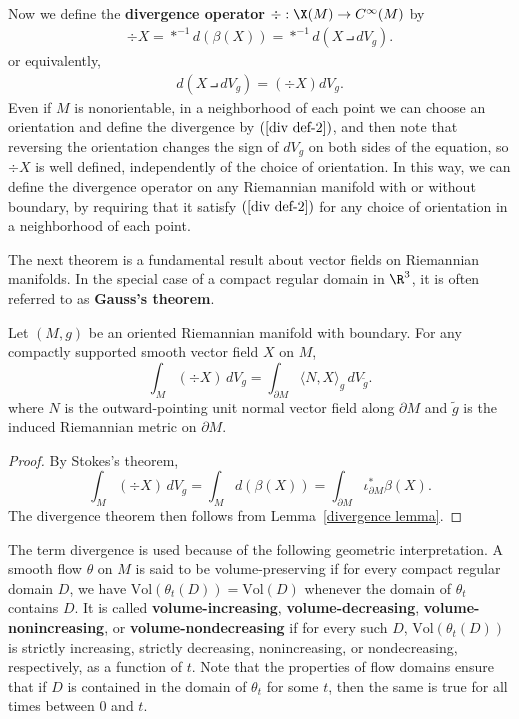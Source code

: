 Now we define the \textbf{divergence operator} $\div:\X(M)\to C^\infty(M)$ by
\begin{align}\label{div def-1}
\div X=\ast^{-1}d(\beta(X))=\ast^{-1}d(X\intprod dV_g).
\end{align}
or equivalently,
\begin{align}\label{div def-2}
d(X\intprod dV_g)=(\div X)dV_g.
\end{align}
Even if $M$ is nonorientable, in a neighborhood of each point we can choose an orientation and define the divergence by $(\ref{div def-2})$, and then note that reversing the orientation changes the sign of $dV_g$ on both sides of the equation, so $\div X$ is well defined, independently of the choice of orientation. In this way, we can define the divergence operator on any Riemannian manifold with or without boundary, by requiring that it satisfy $(\ref{div def-2})$ for any choice of orientation in a neighborhood of each point.\par
The next theorem is a fundamental result about vector fields on Riemannian manifolds. In the special case of a compact regular domain in $\R^3$, it is often referred to as \textbf{Gauss's theorem}.
\begin{theorem}
Let $(M,g)$ be an oriented Riemannian manifold with boundary. For any compactly supported smooth vector field $X$ on $M$,
\[\int_M(\div X)\,dV_g=\int_{\partial M}\langle N,X\rangle_g\,dV_{\widetilde{g}}.\]
where $N$ is the outward-pointing unit normal vector field along $\partial M$ and $\widetilde{g}$ is the induced Riemannian metric on $\partial M$.
\end{theorem}
\begin{proof}
By Stokes's theorem,
\[\int_M(\div X)\,dV_g=\int_Md(\beta(X))=\int_{\partial M}\iota^*_{\partial M}\beta(X).\]
The divergence theorem then follows from Lemma~\ref{divergence lemma}.
\end{proof}
The term divergence is used because of the following geometric interpretation. A smooth flow $\theta$ on $M$ is said to be volume-preserving if for every compact regular domain $D$, we have $\mathrm{Vol}(\theta_t(D))=\mathrm{Vol}(D)$ whenever the domain of $\theta_t$ contains $D$. It is called \textbf{volume-increasing}, \textbf{volume-decreasing}, \textbf{volume-nonincreasing}, or \textbf{volume-nondecreasing} if for every such $D$, $\mathrm{Vol}(\theta_t(D))$ is strictly increasing, strictly decreasing, nonincreasing, or nondecreasing, respectively, as a function of $t$. Note that the properties of flow domains ensure that if $D$ is contained in the domain of $\theta_t$ for some $t$, then the same is true for all times between $0$ and $t$.\par
